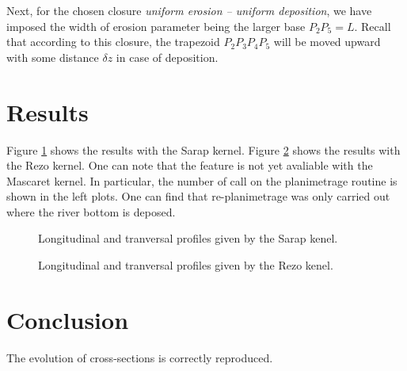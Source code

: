 Next, for the chosen closure {\em uniform erosion -- uniform deposition}, we have
imposed the width of erosion parameter being the larger base $P_2P_5 = L$. Recall
that according to this closure, the trapezoid $P_2P_3P_4P_5$ will be moved upward
with some distance $\delta z$ in case of deposition.

\section{Results}

Figure \ref{soni_trapeze:fig:sarap} shows the results with the Sarap kernel.
Figure \ref{soni_trapeze:fig:rezo} shows the results with the Rezo kernel.
One can note that the feature is not yet avaliable with the Mascaret kernel.
In particular,
the number of call on the planimetrage routine is shown in the left plots. One can
find that re-planimetrage was only carried out where the river bottom is deposed.
\begin{figure}[!ht]
 \centering
 \caption{Longitudinal and tranversal profiles given by the Sarap kenel.}
 \label{soni_trapeze:fig:sarap}
\end{figure}

\begin{figure}[!ht]
 \centering
 \caption{Longitudinal and tranversal profiles given by the Rezo kenel.}
 \label{soni_trapeze:fig:rezo}
\end{figure}

\section{Conclusion}
The evolution of cross-sections is correctly reproduced.
